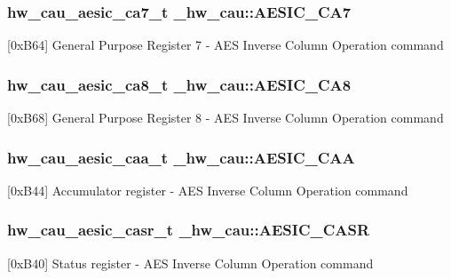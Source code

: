 \subsubsection[{\texorpdfstring{A\+E\+S\+I\+C\+\_\+\+C\+A7}{AESIC_CA7}}]{ {\bf hw\+\_\+cau\+\_\+aesic\+\_\+ca7\+\_\+t} \+\_\+hw\+\_\+cau\+::\+A\+E\+S\+I\+C\+\_\+\+C\+A7}\hypertarget{struct__hw__cau_aabaf8ec257003dfb01e8d6f7f4001ac4}{}\label{struct__hw__cau_aabaf8ec257003dfb01e8d6f7f4001ac4}
\mbox{[}0x\+B64\mbox{]} General Purpose Register 7 -\/ A\+ES Inverse Column Operation command 
\subsubsection[{\texorpdfstring{A\+E\+S\+I\+C\+\_\+\+C\+A8}{AESIC_CA8}}]{ {\bf hw\+\_\+cau\+\_\+aesic\+\_\+ca8\+\_\+t} \+\_\+hw\+\_\+cau\+::\+A\+E\+S\+I\+C\+\_\+\+C\+A8}\hypertarget{struct__hw__cau_ae4e6fb5a34b1ccd3b9c963697e7e9ccf}{}\label{struct__hw__cau_ae4e6fb5a34b1ccd3b9c963697e7e9ccf}
\mbox{[}0x\+B68\mbox{]} General Purpose Register 8 -\/ A\+ES Inverse Column Operation command 
\subsubsection[{\texorpdfstring{A\+E\+S\+I\+C\+\_\+\+C\+AA}{AESIC_CAA}}]{ {\bf hw\+\_\+cau\+\_\+aesic\+\_\+caa\+\_\+t} \+\_\+hw\+\_\+cau\+::\+A\+E\+S\+I\+C\+\_\+\+C\+AA}\hypertarget{struct__hw__cau_a77564683bc581b5aba19895f32863441}{}\label{struct__hw__cau_a77564683bc581b5aba19895f32863441}
\mbox{[}0x\+B44\mbox{]} Accumulator register -\/ A\+ES Inverse Column Operation command 
\subsubsection[{\texorpdfstring{A\+E\+S\+I\+C\+\_\+\+C\+A\+SR}{AESIC_CASR}}]{ {\bf hw\+\_\+cau\+\_\+aesic\+\_\+casr\+\_\+t} \+\_\+hw\+\_\+cau\+::\+A\+E\+S\+I\+C\+\_\+\+C\+A\+SR}\hypertarget{struct__hw__cau_a2613fe3563919cfee8b54bbcd866324a}{}\label{struct__hw__cau_a2613fe3563919cfee8b54bbcd866324a}
\mbox{[}0x\+B40\mbox{]} Status register -\/ A\+ES Inverse Column Operation command 
